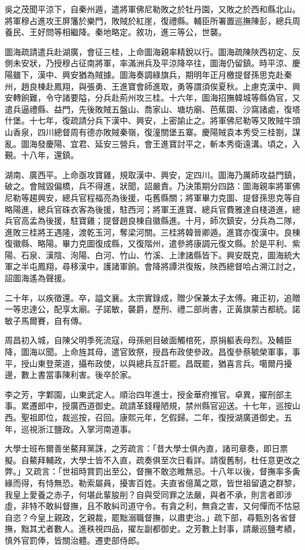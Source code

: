 \begin{pinyinscope}
吳之茂聞平涼下，自秦州遁，遣將軍佛尼勒敗之於牡丹園，又敗之於西和縣北山。將軍穆占進攻王屏籓於樂門，敗賊於紅崖，復禮縣。輔臣所署置巡撫陳彭，總兵周養民、王好問等相繼降。秦地略定。敘功，進三等公，世襲。

圖海疏請遣兵赴湖廣，會征三桂，上命圖海親率精銳以行。圖海疏陳陜西初定、反側未安狀，乃授穆占征南將軍，率滿洲兵及平涼降卒往，圖海仍留鎮。時平涼、慶陽雖下，漢中、興安猶為賊據。圖海奏調綠旗兵，期明年正月檄提督孫思克赴秦州，趙良棟赴鳳翔，與張勇、王進寶會師進取，勇等謂須俟夏秋。上慮克漢中、興安轉餉難，令守諸要隘，分兵赴荊州攻三桂。十六年，圖海招撫韓城等縣偽官，又遣兵逼禮縣、益門，先後敗賊五盤山、喬家山、塘坊廟、芭蕉園、沙窩諸處，復塔什堡。十七年，復疏請分兵下漢中、興安，上密諭止之。將軍佛尼勒等又敗賊牛頭山香泉，四川總督周有德亦敗賊秦嶺，復潼關堡五寨。慶陽賊袁本秀受三桂劄，謀亂。圖海發慶陽、宜君、延安三營兵，會王進寶討平之，斬本秀衛遠溝。頃之，入覲。十八年，還鎮。

湖南、廣西平。上命亟攻寶雞，規取漢中、興安，定四川。圖海乃厲師攻益門鎮，破之。會賊毀偏橋，兵不得進，狀聞，詔嚴責。乃決策期分四路：圖海親率將軍佛尼勒等趨興安，總兵官程福亮為後援，屯舊縣關；將軍畢力克圖、提督孫思克等自略陽進，總兵官硃衣客為後援，駐西河；將軍王進寶、總兵官費雅達自棧道進，總兵官高孟為後援，駐寶雞；提督趙良棟自徽縣進。十月，師次鎮安，分兵為二隊，進敗三桂將王遇隆，渡乾玉河，奪梁河關。三桂將韓晉卿遁。進寶亦復漢中。良棟復徽縣、略陽。畢力克圖復成縣，又復階州，遣參將康調元復文縣。於是平利、紫陽、石泉、漢陰、洵陽、白河、竹山、竹溪、上津諸縣皆下。興安既克，圖海統大軍之半屯鳳翔，尋移漢中，護諸軍餉。會降將譚洪復叛，陜西總督哈占溯江討之，詔圖海遙為聲援。

二十年，以疾徵還。卒，謚文襄。太宗實錄成，贈少保兼太子太傅。雍正初，追贈一等忠達公，配享太廟。子諾敏，襲爵，歷刑、禮二部尚書，正黃旗蒙古都統。諾敏子馬爾賽，自有傳。

周昌初入城，自陳父明季死流寇，母孫剜目破面觸棺死，原捐軀表母烈。及輔臣降，圖海以聞。上命旌其母，遣官致祭，授昌布政使參政。昌復參蔡毓榮軍事，事平，授山東登萊道，攝布政使，以與總兵互訐罷。昌既罷，猶喜言兵。噶爾丹擾邊，數上書當事陳利害。後卒於家。

李之芳，字鄴園，山東武定人。順治四年進士，授金華府推官。卓異，擢刑部主事。累遷郎中，授廣西道御史。疏請革錢糧陋規，禁州縣官迎送。十七年，巡按山西。聖祖即位，裁巡按，召回。康熙元年，乞假歸。二年，復授湖廣道御史。五年，巡視浙江鹽政。入掌河南道事。

大學士班布爾善坐鰲拜黨誅，之芳疏言：「昔大學士俱內直，諸司章奏，即日票擬。自鰲拜輔政，大學士皆不入直，疏奏俱至次日看詳。請復舊制，杜任意更改之弊。」又疏言：「世祖時賞罰出至公，督撫不敢恣睢無忌。十八年以後，督撫率多夤緣而得，有恃無恐。勒索屬員，擾害百姓。夫直省億萬之眾，皆世祖留遺之群黎，我皇上愛養之赤子，何堪此輩朘削？自與受同罪之法嚴，與者不承，則言者即涉虛，非特不敢糾督撫，且不敢糾司道守令。有貪之利，無貪之害，又何憚而不怙惡自恣？今皇上親政，乞親裁，罷黜溺職督撫，以肅吏治。」疏下部，尋甄別各省督撫，黜其尤者數人。進秩視四品，擢左副都御史。之芳數上封事，請嚴巡鹽考績，慎外官罰俸，皆關治體。遷吏部侍郎。


\end{pinyinscope}
